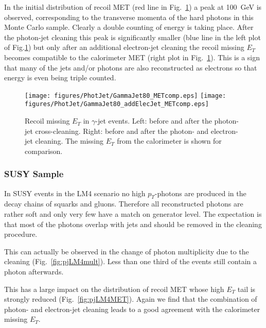 \documentclass{cmspaper}
\begin{document}
In the initial distribution of recoil MET (red line in
Fig.~\ref{fig:pjMET}) a peak at 100\ GeV is observed, corresponding to the
transverse momenta of the hard photons in this Monte Carlo sample. Clearly a
double counting of energy is taking place.  After the photon-jet cleaning this
peak is significantly smaller (blue line in the left plot of
Fig.\ref{fig:pjMET}) but only after an additional electron-jet cleaning the
recoil missing $E_T$ becomes compatible to the calorimeter MET (right plot in
Fig.~\ref{fig:pjMET}). This is a sign that many of the jets and/or photons are
also reconstructed as electrons so that energy is even being triple counted.
\begin{figure}[hbtp]
  \begin{center}
    \texttt{[image: figures/PhotJet/GammaJet80\_METcomp.eps]}
    \texttt{[image: figures/PhotJet/GammaJet80\_addElecJet\_METcomp.eps]}
    \caption{Recoil missing $E_T$ in $\gamma$-jet events. Left: before and
    after the photon-jet cross-cleaning. Right: before and after the photon-
    and electron-jet cleaning. The missing $E_T$ from the calorimeter is shown
    for comparison.}
    \label{fig:pjMET}
  \end{center}
\end{figure}

\clearpage
\subsubsection{SUSY Sample}
In SUSY events in the LM4 scenario no high $p_T$-photons are produced in the
decay chains of squarks and gluons. Therefore all reconstructed photons are rather soft and only very
few have a match on generator level. The expectation is that most of the
photons overlap with jets and should be removed in the cleaning procedure.

This can actually be observed in the change of photon multiplicity due to the
cleaning (Fig.~\ref{fig:pjLM4mult}). Less than one third of the events still
contain a photon afterwards.

This has a large impact on the distribution of recoil MET whose high $E_T$ tail
is strongly reduced (Fig.~\ref{fig:pjLM4MET}). Again we find that the
combination of photon- and electron-jet cleaning leads to a good agreement with
the calorimeter missing $E_T$.
\end{document}
